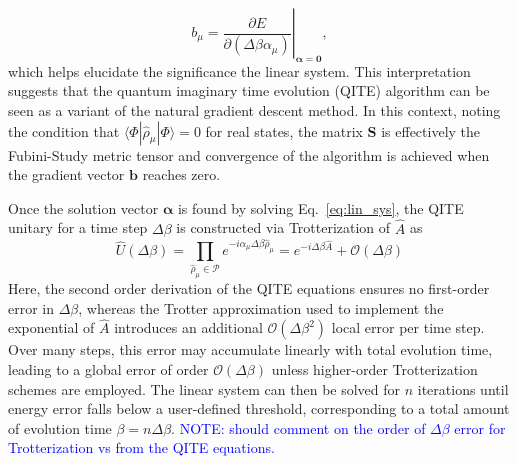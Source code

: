 \documentclass[aip,jcp,amsmath,amssymb, reprint]{revtex4-1}
\newcommand{\note}[2]{%
  \ifthenelse{\boolean{shownotes}}%
    {\textcolor{#1}{#2}}%
    {}%
}
\begin{document}
\begin{equation}
b_\mu = \left. \frac{\partial E}{\partial (\Delta \beta \alpha_\mu)}  \right|_{\boldsymbol{\alpha} = \mathbf{0}},
\end{equation}
which helps elucidate the significance the linear system. 
This interpretation suggests that the quantum imaginary time evolution (QITE) algorithm can be seen as a variant of the natural gradient descent method. 
In this context, noting the condition that $\langle \Phi | \hat{\rho}_\mu | \Phi \rangle = 0$ for real states, the matrix $\mathbf{S}$ is effectively the Fubini-Study metric tensor \cite{stokes2020quantum, gacon2021simultaneous} and convergence of the algorithm is achieved when the gradient vector $\mathbf{b}$ reaches zero.

Once the solution vector $\boldsymbol{\alpha}$ is found by solving Eq.~\eqref{eq:lin_sys}, the QITE unitary for a time step $\Delta \beta$ is constructed via Trotterization of $\hat{A}$ as
\begin{equation}
\hat{U}(\Delta \beta) = \prod_{\hat{ \rho}_\mu \in \mathcal{P}} e^{-i \alpha_\mu \Delta \beta \hat{\rho}_\mu } 
= e^{-i\Delta \beta \hat{A}} + \mathcal{O}(\Delta \beta)
\end{equation}
Here, the second order derivation of the QITE equations ensures no first-order error in $\Delta \beta$, whereas the Trotter approximation used to implement the exponential of $\hat{A}$ introduces an additional $\mathcal{O}(\Delta \beta^2)$ local error per time step. Over many steps, this error may accumulate linearly with total evolution time, leading to a global error of order $\mathcal{O}(\Delta \beta)$ unless higher-order Trotterization schemes are employed. The linear system can then be solved for $n$ iterations until energy error falls below a user-defined threshold, corresponding to a total amount of evolution time $\beta = n \Delta \beta$.
\note{blue}{NOTE: should comment on the order of $\Delta \beta$ error for Trotterization vs from the QITE equations.}
\end{document}
